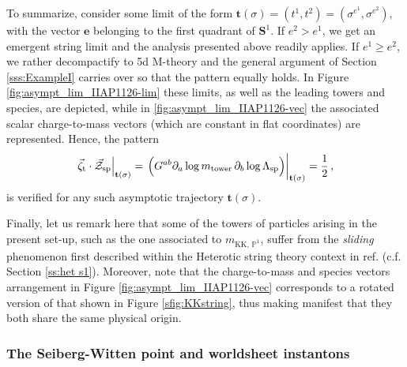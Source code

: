 To summarize, consider some limit of the form $\mathbf{t}(\sigma) = \left( t^1, t^2 \right) = \left(\sigma^{e^1}, \sigma^{e^2}\right)$, with the vector $\mathbf{e}$ belonging to the first quadrant of $\mathbf{S}^1$. If  $e^2 > e^1$, we get an emergent string limit and the analysis presented above readily applies. If $e^1 \geq e^2$, we rather decompactify to 5d M-theory and the general argument of Section \ref{sss:ExampleI} carries over so that the pattern equally holds. In Figure \ref{fig:asympt_lim_IIAP1126-lim} these limits, as well as the leading towers and species, are depicted, while in \ref{fig:asympt_lim_IIAP1126-vec} the associated scalar charge-to-mass vectors (which are constant in flat coordinates) are represented. Hence, the pattern
%
\begin{equation}\label{eq:patternP11226}
	\left.\vec{\zeta}_{\text{t}}\cdot\vec{\mathcal{Z}}_{\rm sp}\right|_{\mathbf{t}(\sigma)}=\left.\left(G^{a b}\partial_{a}\log m_{\text{tower}}\,\partial_{b}\log \Lambda_{\rm sp}\right)\right|_{\mathbf{t}(\sigma)} = \frac{1}{2}\, ,
\end{equation}
%
is verified for any such asymptotic trajectory $\mathbf{t}(\sigma)$. 
	
Finally, let us remark here that some of the towers of particles arising in the present set-up, such as the one associated to $m_{\text{KK}, \, \mathbb{P}^1}$, suffer from the \emph{sliding} phenomenon first described within the Heterotic string theory context in ref. \cite{Etheredge:2023odp} (c.f. Section \ref{ss:het s1}). Moreover, note that the charge-to-mass and species vectors arrangement in Figure \ref{fig:asympt_lim_IIAP1126-vec} corresponds to a rotated version of that shown in Figure \ref{sfig:KKstring}, thus making manifest that they both share the same physical origin.

\subsubsection*{The Seiberg-Witten point and worldsheet instantons}

